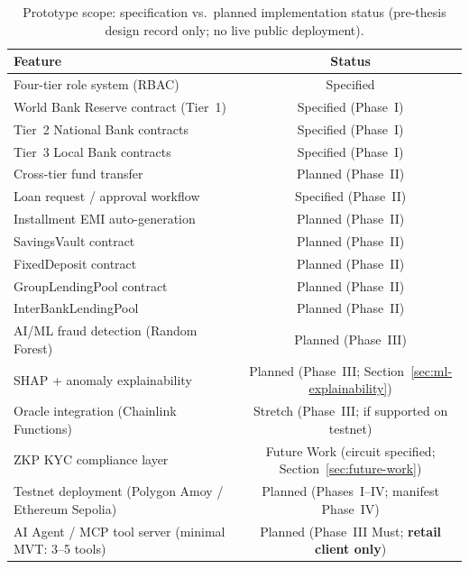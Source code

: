 \documentclass[12pt,a4paper]{report}
\newcommand{\tmarkPartial}{\faHourglassHalf}
\newcommand{\tmarkPlanned}{\textcolor{black!55}{\faCircle}}
\newcommand{\tableheadcolor}{\rowcolor{TableHeadBg}}
\newcommand{\tableheadfont}{\bfseries}
\begin{document}
\begin{table}[H]
\centering
\caption[Prototype scope and implementation status]{Prototype scope: specification vs.\ planned implementation status (pre-thesis design record only; no live public deployment).}
\label{tab:prototype-scope}
\begin{tabular}{@{}p{7.5cm}c@{}}
\toprule
\tableheadcolor
\tableheadfont Feature & \tableheadfont Status \\
\midrule
Four-tier role system (RBAC) & \tmarkPartial{} Specified \\
\rowcolor{RowShade}
World Bank Reserve contract (Tier~1) & \tmarkPartial{} Specified (Phase~I) \\
Tier~2 National Bank contracts & \tmarkPartial{} Specified (Phase~I) \\
\rowcolor{RowShade}
Tier~3 Local Bank contracts & \tmarkPartial{} Specified (Phase~I) \\
Cross-tier fund transfer & \tmarkPlanned{} Planned (Phase~II) \\
\rowcolor{RowShade}
Loan request / approval workflow & \tmarkPartial{} Specified (Phase~II) \\
Installment EMI auto-generation & \tmarkPlanned{} Planned (Phase~II) \\
\rowcolor{RowShade}
SavingsVault contract & \tmarkPlanned{} Planned (Phase~II) \\
FixedDeposit contract & \tmarkPlanned{} Planned (Phase~II) \\
\rowcolor{RowShade}
GroupLendingPool contract & \tmarkPlanned{} Planned (Phase~II) \\
InterBankLendingPool & \tmarkPlanned{} Planned (Phase~II) \\
\rowcolor{RowShade}
AI/ML fraud detection (Random Forest) & \tmarkPlanned{} Planned (Phase~III) \\
SHAP + anomaly explainability & \tmarkPlanned{} Planned (Phase~III; Section~\ref{sec:ml-explainability}) \\
\rowcolor{RowShade}
Oracle integration (Chainlink Functions) & \tmarkPlanned{} Stretch (Phase~III; if supported on testnet) \\
ZKP KYC compliance layer & \tmarkPlanned{} Future Work (circuit specified; Section~\ref{sec:future-work}) \\
\rowcolor{RowShade}
Testnet deployment (Polygon Amoy / Ethereum Sepolia) & \tmarkPlanned{} Planned (Phases~I--IV; manifest Phase~IV) \\
AI Agent / MCP tool server (minimal MVT: 3--5 tools) & \tmarkPlanned{} Planned (Phase~III Must; \textbf{retail client only}) \\

\end{tabular}
\end{table}
\end{document}

